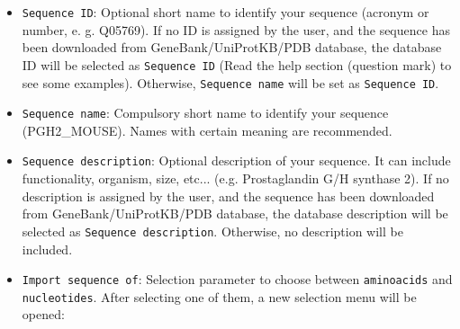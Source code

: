 \documentclass[12pt, draft]{article} %
\newcommand{\ttt}[1]{\texttt{#1}}
\begin{document}
\begin{appendices}
\begin{itemize}
  \begin{itemize}
  \item \ttt{Sequence ID}: Optional short name to identify your sequence (acronym or number, e. g. Q05769). If no ID is assigned by the user, and the sequence has been downloaded from GeneBank/UniProtKB/PDB database, the database ID will be selected as \ttt{Sequence ID} (Read the help section (question mark) to see some examples). Otherwise, \ttt{Sequence name} will be set as \ttt{Sequence ID}.\\
  \item \ttt{Sequence name}: Compulsory short name to identify your sequence (PGH2\_MOUSE). Names with certain meaning are recommended.\\
  \item \ttt{Sequence description}: Optional description of your sequence. It can include functionality, organism, size, etc... (e.g. Prostaglandin G/H synthase 2). If no description is assigned by the user, and the sequence has been downloaded from GeneBank/UniProtKB/PDB database, the database description will be selected as \ttt{Sequence description}. Otherwise, no description will be included.\\
  \item \ttt{Import sequence of}: Selection parameter to choose between \ttt{aminoacids} and \ttt{nucleotides}. After selecting one of them, a new selection menu will be opened:\\
  

\end{itemize}
\end{itemize}
\end{appendices}
\end{document}
